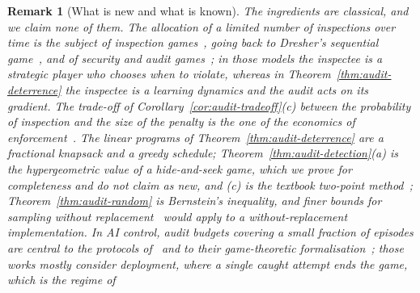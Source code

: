\documentclass[11pt,a4paper]{article}
\newtheorem{remark}[theorem]{Remark}
\begin{document}
\begin{remark}[What is new and what is known]\label{rem:audit-related}
The ingredients are classical, and we claim none of them. The allocation of a
limited number of inspections over time is the subject of inspection
games~\cite{avenhaus2002inspection}, going back to Dresher's sequential
game~\cite{dresher1962sampling}, and of security and audit
games~\cite{tambe2011security,blocki2013audit}; in those models the inspectee is
a strategic player who chooses when to violate, whereas in
Theorem~\ref{thm:audit-deterrence} the inspectee is a learning dynamics and the
audit acts on its gradient. The trade-off of
Corollary~\ref{cor:audit-tradeoff}(c) between the probability of inspection and
the size of the penalty is the one of the economics of
enforcement~\cite{becker1968crime}. The linear programs of
Theorem~\ref{thm:audit-deterrence} are a fractional knapsack and a greedy
schedule; Theorem~\ref{thm:audit-detection}(a) is the hypergeometric value of a
hide-and-seek game, which we prove for completeness and do not claim as new,
and (c) is the textbook two-point method~\cite{lecam1973convergence,yu1997assouad};
Theorem~\ref{thm:audit-random} is Bernstein's inequality, and finer bounds for
sampling without replacement~\cite{hoeffding1963probability,serfling1974probability}
would apply to a without-replacement implementation. In AI control, audit
budgets covering a small fraction of episodes are central to the protocols
of~\cite{greenblatt2023control} and to their game-theoretic
formalisation~\cite{griffin2024games}; those works mostly consider deployment, where a
single caught attempt ends the game, which is the regime of

\end{remark}
\end{document}
